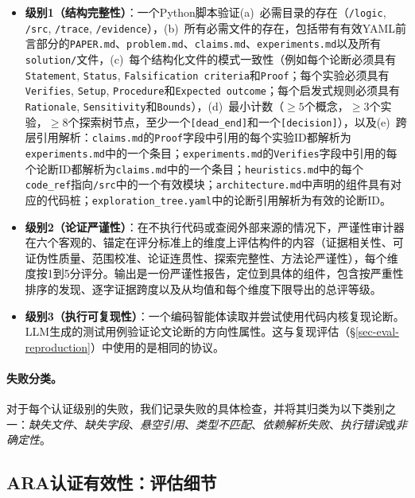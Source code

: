 \begin{itemize}[leftmargin=*, itemsep=2pt]
    \item \textbf{级别1（结构完整性）}：一个Python脚本验证(a)~必需目录的存在（\texttt{/logic}, \texttt{/src}, \texttt{/trace}, \texttt{/evidence}），(b)~所有必需文件的存在，包括带有有效YAML前言部分的\texttt{PAPER.md}、\texttt{problem.md}、\texttt{claims.md}、\texttt{experiments.md}以及所有\texttt{solution/}文件，(c)~每个结构化文件的模式一致性（例如每个论断必须具有\texttt{Statement}, \texttt{Status}, \texttt{Falsification criteria}和\texttt{Proof}；每个实验必须具有\texttt{Verifies}, \texttt{Setup}, \texttt{Procedure}和\texttt{Expected outcome}；每个启发式规则必须具有\texttt{Rationale}, \texttt{Sensitivity}和\texttt{Bounds}），(d)~最小计数（$\geq 5$个概念，$\geq 3$个实验，$\geq 8$个探索树节点，至少一个\texttt{[dead\_end]}和一个\texttt{[decision]}），以及(e)~跨层引用解析：\texttt{claims.md}的\texttt{Proof}字段中引用的每个实验ID都解析为\texttt{experiments.md}中的一个条目；\texttt{experiments.md}的\texttt{Verifies}字段中引用的每个论断ID都解析为\texttt{claims.md}中的一个条目；\texttt{heuristics.md}中的每个\texttt{code\_ref}指向\texttt{/src}中的一个有效模块；\texttt{architecture.md}中声明的组件具有对应的代码桩；\texttt{exploration\_tree.yaml}中的论断引用解析为有效的论断ID。
    \item \textbf{级别2（论证严谨性）}：在不执行代码或查阅外部来源的情况下，严谨性审计器在六个客观的、锚定在评分标准上的维度上评估构件的内容（证据相关性、可证伪性质量、范围校准、论证连贯性、探索完整性、方法论严谨性），每个维度按1到5分评分。输出是一份严谨性报告，定位到具体的\ara{}组件，包含按严重性排序的发现、逐字证据跨度以及从均值和每个维度下限导出的总评等级。
    \item \textbf{级别3（执行可复现性）}：一个编码智能体读取\ara{}并尝试使用代码内核复现论断。LLM生成的测试用例验证论文论断的方向性属性。这与复现评估（\S\ref{sec-eval-reproduction}）中使用的是相同的协议。
\end{itemize}

\paragraph{失败分类。}
对于每个认证级别的失败，我们记录失败的具体检查，并将其归类为以下类别之一：\emph{缺失文件}、\emph{缺失字段}、\emph{悬空引用}、\emph{类型不匹配}、\emph{依赖解析失败}、\emph{执行错误}或\emph{非确定性}。

\subsection{ARA认证有效性：评估细节}
\label{sec-seal-eval}

